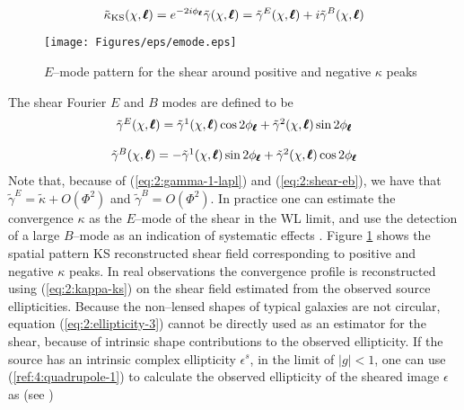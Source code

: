 \begin{equation}
\label{eq:2:kappa-ks}
\tilde{\kappa}_{\rm KS}(\chi,\pmb{\ell}) = e^{-2i\phi_{\pmb{\ell}}} \tilde{\gamma}(\chi,\pmb{\ell}) = \tilde{\gamma}^E(\chi,\pmb{\ell}) + i\tilde{\gamma}^B(\chi,\pmb{\ell})
\end{equation}
%
\begin{figure}
\begin{center}
\texttt{[image: Figures/eps/emode.eps]}
\end{center}
\caption{$E$--mode pattern for the shear around positive and negative $\kappa$ peaks}
\label{fig:2:emode}
\end{figure}
%
The shear Fourier $E$ and $B$ modes are defined to be 
\begin{equation}
\label{eq:2:shear-eb}
\begin{matrix}
\tilde{\gamma}^E(\chi,\pmb{\ell}) =  \tilde{\gamma}^1(\chi,\pmb{\ell})\cos 2\phi_{\pmb{\ell}} +  \tilde{\gamma}^2(\chi,\pmb{\ell}) \sin 2\phi_{\pmb{\ell}}\\ \\ 
\tilde{\gamma}^B(\chi,\pmb{\ell}) = - \tilde{\gamma}^1(\chi,\pmb{\ell})\sin 2\phi_{\pmb{\ell}} + \tilde{\gamma}^2(\chi,\pmb{\ell}) \cos 2\phi_{\pmb{\ell}}
\end{matrix}
\end{equation}
%
Note that, because of (\ref{eq:2:gamma-1-lapl}) and (\ref{eq:2:shear-eb}), we have that $\tilde{\gamma}^E=\tilde{\kappa}+O(\Phi^2)$ and $\tilde{\gamma}^B=O(\Phi^2)$. In practice one can estimate the convergence $\kappa$ as the $E$--mode of the shear in the WL limit, and use the detection of a large $B$--mode as an indication of systematic effects \citep{PetriSpShear}. Figure \ref{fig:2:emode} shows the spatial pattern KS reconstructed shear field corresponding to positive and negative $\kappa$ peaks. In real observations the convergence profile is reconstructed using (\ref{eq:2:kappa-ks}) on the shear field estimated from the observed source ellipticities. Because the non--lensed shapes of typical galaxies are not circular, equation (\ref{eq:2:ellipticity-3}) cannot be directly used as an estimator for the shear, because of intrinsic shape contributions to the observed ellipticity. If the source has an intrinsic complex ellipticity $\epsilon^s$, in the limit of $\vert g\vert<1$, one can use (\ref{ref:4:quadrupole-1}) to calculate the observed ellipticity of the sheared image $\epsilon$ as (see \citep{RayTracingHartlap})

